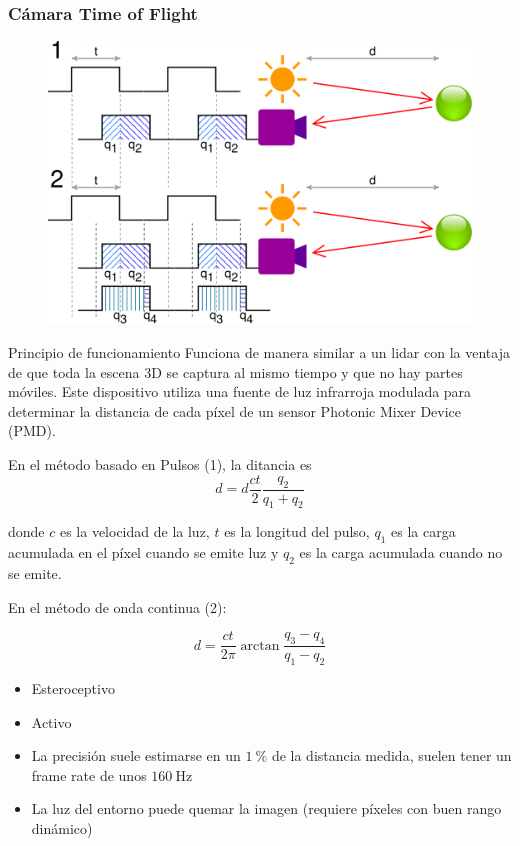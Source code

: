 \begin{frame}
    \frametitle{Cámara Time of Flight}
    \scriptsize

    \begin{figure}[!h]
        \includegraphics[width=0.4\columnwidth]{images/time_of_flight_camera.pdf}
    \end{figure}
    
    \begin{block}{Principio de funcionamiento}
        Funciona de manera similar a un lidar con la ventaja de que toda la escena 3D se captura al mismo tiempo y que no hay partes móviles. Este dispositivo utiliza una fuente de luz infrarroja modulada para determinar la distancia de cada píxel de un sensor Photonic Mixer Device (PMD).
        
        En el método basado en Pulsos (1), la ditancia es
        \begin{equation*}
            d = d\frac{c t}{2} \dfrac{q_{2}}{q_{1} + q_{2}}
        \end{equation*}
        
        donde $c$ es la velocidad de la luz, $t$ es la longitud del pulso, $q_{1}$ es la carga acumulada en el píxel cuando se emite luz y $q_{2}$ es la carga acumulada cuando no se emite.
        
        En el método de onda continua (2):
        
        \begin{equation*}
            d = \frac{c t}{2\pi} \arctan \dfrac{q_{3} - q_{4}}{q_{1} - q_{2}}
        \end{equation*}        
    \end{block}
    
    \begin{itemize}
        \item Esteroceptivo
        \item Activo
        \item La precisión suele estimarse en un $\SI{1}{\percent}$ de la distancia medida, suelen tener un frame rate de unos $\SI{160}{\hertz}$
        \item La luz del entorno puede quemar la imagen (requiere píxeles con buen rango dinámico)
    \end{itemize}
    
\end{frame}